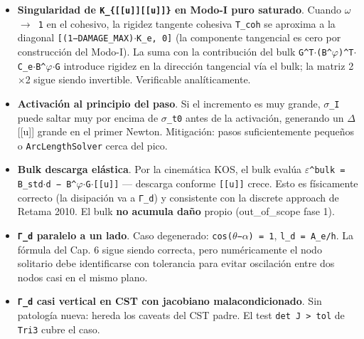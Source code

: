 \documentclass[11pt,letterpaper,oneside]{report}
\begin{document}
\begin{itemize}
  \item \textbf{Singularidad de \texttt{K\_\{[[u]][[u]]\}} en Modo-I puro saturado}. Cuando \texttt{\ensuremath{\omega} \ensuremath{\to} 1} en el cohesivo, la rigidez tangente cohesiva \texttt{T\_coh} se aproxima a la diagonal \texttt{[(1−DAMAGE\_MAX)\ensuremath{\cdot}K\_e, 0]} (la componente tangencial es cero por construcción del Modo-I). La suma con la contribución del bulk \texttt{G\textasciicircum{}T\ensuremath{\cdot}(B\textasciicircum{}\ensuremath{\varphi})\textasciicircum{}T\ensuremath{\cdot}C\_e\ensuremath{\cdot}B\textasciicircum{}\ensuremath{\varphi}\ensuremath{\cdot}G} introduce rigidez en la dirección tangencial vía el bulk; la matriz 2\ensuremath{\times}2 sigue siendo invertible. Verificable analíticamente.
  \item \textbf{Activación al principio del paso}. Si el incremento es muy grande, \texttt{\ensuremath{\sigma}\_I} puede saltar muy por encima de \texttt{\ensuremath{\sigma}\_t0} antes de la activación, generando un \ensuremath{\Delta}[[u]] grande en el primer Newton. Mitigación: pasos suficientemente pequeños o \texttt{ArcLengthSolver} cerca del pico.
  \item \textbf{Bulk descarga elástica}. Por la cinemática KOS, el bulk evalúa \texttt{\ensuremath{\varepsilon}\textasciicircum{}bulk = B\_std\ensuremath{\cdot}d − B\textasciicircum{}\ensuremath{\varphi}\ensuremath{\cdot}G\ensuremath{\cdot}[[u]]} --- descarga conforme \texttt{[[u]]} crece. Esto es físicamente correcto (la disipación va a \texttt{Γ\_d}) y consistente con la discrete approach de Retama 2010. El bulk \textbf{no acumula daño} propio (out\_of\_scope fase 1).
  \item \textbf{\texttt{Γ\_d} paralelo a un lado}. Caso degenerado: \texttt{cos(\ensuremath{\theta}−\ensuremath{\alpha}) = 1}, \texttt{l\_d = A\_e/h}. La fórmula del Cap. 6 sigue siendo correcta, pero numéricamente el nodo solitario debe identificarse con tolerancia para evitar oscilación entre dos nodos casi en el mismo plano.
  \item \textbf{\texttt{Γ\_d} casi vertical en CST con jacobiano malacondicionado}. Sin patología nueva: hereda los caveats del CST padre. El test \texttt{det J > tol} de \texttt{Tri3} cubre el caso.

\end{itemize}
\end{document}
